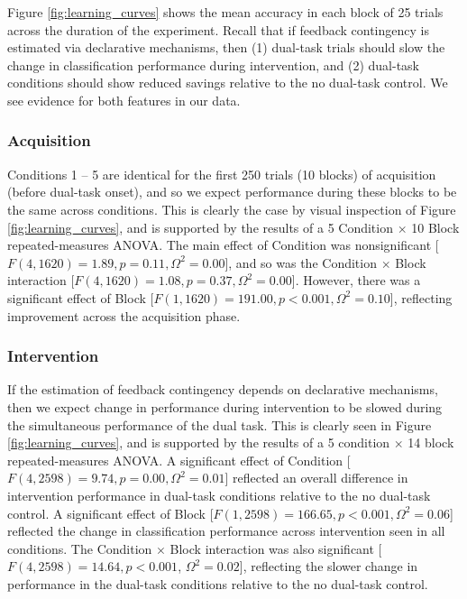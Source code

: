 \documentclass[man,apacite,draftfirst]{apa6}
\begin{document}
Figure \ref{fig:learning_curves} shows the mean accuracy in each block of 25
trials across the duration of the experiment. Recall that if feedback
contingency is estimated via declarative mechanisms, then (1) dual-task trials
should slow the change in classification performance during intervention, and
(2) dual-task conditions should show reduced savings relative to the no
dual-task control. We see evidence for both features in our data.

\subsubsection*{Acquisition}
Conditions 1 -- 5 are identical for the first 250 trials (10 blocks) of
acquisition (before dual-task onset), and so we expect performance during these
blocks to be the same across conditions. This is clearly the case by visual
inspection of Figure \ref{fig:learning_curves}, and is supported by the results
of a 5 Condition $\times$ 10 Block repeated-measures ANOVA. The main effect of Condition was
nonsignificant [$F(4,1620) = 1.89, p = 0.11, \Omega^2 = 0.00$], and so was the
Condition $\times$ Block interaction [$F(4,1620) = 1.08, p = 0.37, \Omega^2 =
0.00$]. However, there was a significant effect of Block [$F(1,1620) = 191.00, p
< 0.001, \Omega^2 = 0.10$], reflecting improvement across the acquisition phase.

\subsubsection*{Intervention}
If the estimation of feedback contingency depends on declarative mechanisms,
then we expect change in performance during intervention to be slowed during the
simultaneous performance of the dual task. This is clearly seen in Figure
\ref{fig:learning_curves}, and is supported by the results of a 5 condition
$\times$ 14 block repeated-measures ANOVA. A significant effect of Condition [$F(4,2598) = 9.74, p
= 0.00, \Omega^2 = 0.01$] reflected an overall difference in intervention
performance in dual-task conditions relative to the no dual-task control. A
significant effect of Block [$F(1,2598) = 166.65, p < 0.001, \Omega^2 = 0.06$]
reflected the change in classification performance across intervention seen in
all conditions. The Condition $\times$ Block interaction was also significant
[$F(4,2598) = 14.64, p < 0.001$, $\Omega^2 = 0.02$], reflecting the slower change
in performance in the dual-task conditions relative to the no dual-task control.
\end{document}
